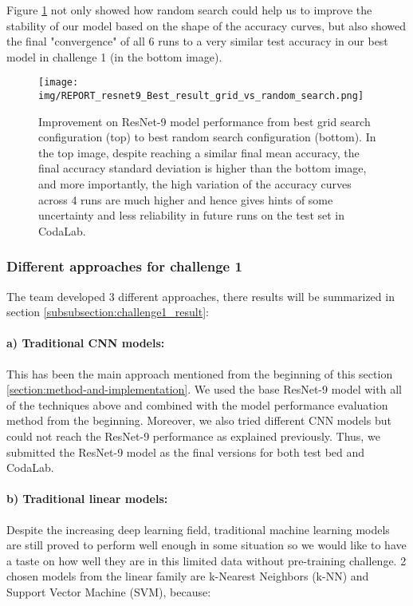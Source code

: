 \documentclass[10pt,twocolumn,letterpaper]{article}
\begin{document}
Figure \ref{figure:grid_vs_random} not only showed how random search could help us to improve the stability of our model based on the shape of the accuracy curves, but also showed the final "convergence" of all 6 runs to a very similar test accuracy in our best model in challenge 1 (in the bottom image). 

 \begin{figure}[h!]
   \centering
       \texttt{[image: img/REPORT\_resnet9\_Best\_result\_grid\_vs\_random\_search.png]}
   \caption{Improvement on ResNet-9 model performance from best grid search configuration (top) to best random search configuration (bottom). In the top image, despite reaching a similar final mean accuracy, the final accuracy standard deviation is higher than the bottom image, and more importantly, the high variation of the accuracy curves across 4 runs are much higher and hence gives hints of some uncertainty and less reliability in future runs on the test set in CodaLab.\label{figure:grid_vs_random}}
 \end{figure}

\subsubsection{Different approaches for challenge 1}

The team developed 3 different approaches, there results will be summarized in section \ref{subsubsection:challenge1_result}:
\paragraph{a) Traditional CNN models:} This has been the main approach mentioned from the beginning of this section  \ref{section:method-and-implementation}. We used the base ResNet-9 model with all of the techniques above and combined with the model performance evaluation method from the beginning. Moreover, we also tried different CNN models but could not reach the ResNet-9 performance as explained previously.
Thus, we submitted the ResNet-9 model as the final versions for both test bed and CodaLab.

\paragraph{b) Traditional linear models:} Despite the increasing deep learning field, traditional machine learning models are still proved to perform well enough in some situation so we would like to have a taste on how well they are in this limited data without pre-training challenge. 2 chosen models from the linear family are k-Nearest Neighbors (k-NN) and Support Vector Machine (SVM), because:
\end{document}
